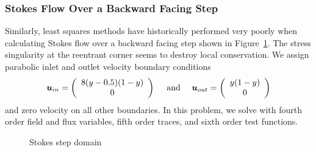 \documentclass[Proposal.tex]{subfiles}
\begin{document}
\subsubsection{Stokes Flow Over a Backward Facing Step}\label{sec:stokesStep}
Similarly, least squares methods have historically performed very poorly when
calculating Stokes flow over a backward facing step shown in
Figure~\ref{fig:stokesStepDomain}. The stress singularity at
the reentrant corner seems to destroy local conservation. We
assign parabolic inlet and outlet velocity boundary conditions
\[
\boldsymbol u_{in}=\left( \begin{array}{c} 8(y-0.5)(1-y)\\ 0\\ \end{array} \right)
\quad\text{ and }\quad
\boldsymbol u_{out}=\left( \begin{array}{c} y(1-y)\\ 0\\ \end{array} \right)
\]
and zero velocity on all other boundaries. In this problem, we solve with
fourth order field and flux variables, fifth order traces, and sixth order
test functions.

\begin{figure}[!h]
\centering
{}
\caption{Stokes step domain}
\label{fig:stokesStepDomain}
\end{figure}
\end{document}
